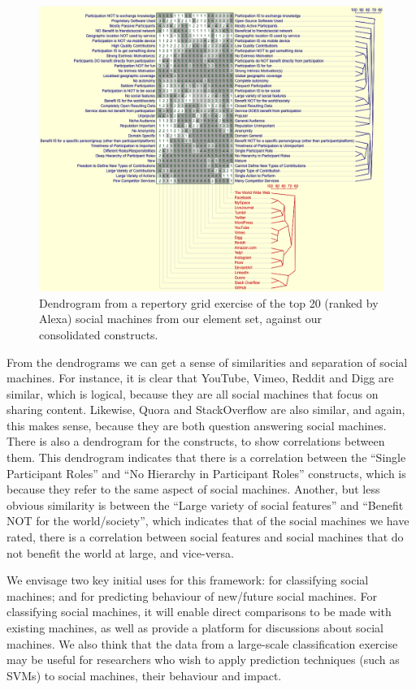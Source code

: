 \documentclass{sig-alternate}
\begin{document}
\begin{figure}
\begin{center}
\includegraphics[width=18cm]{img/dendrogram.png}
\caption{Dendrogram from a repertory grid exercise of the top 20 (ranked by Alexa) social machines from our element set, against our consolidated constructs.} \label{dendrogram}
\end{center}
\end{figure}

From the dendrograms we can get a sense of similarities and separation of social machines. For
instance, it is clear that YouTube, Vimeo, Reddit and Digg are similar, which is logical, because
they are all social machines that focus on sharing content. Likewise, Quora and StackOverflow
are also similar, and again, this makes sense, because they are both question answering social
machines. There is also a dendrogram for the constructs, to show correlations between them. This
dendrogram indicates that there is a correlation between the ``Single Participant Roles'' and
``No Hierarchy in Participant Roles'' constructs, which is because they refer to the same
aspect of social machines. Another, but less obvious similarity is between the ``Large variety of
social features'' and ``Benefit NOT for the world/society'', which indicates that of the social
machines we have rated, there is a correlation between social features and social machines that
do not benefit the world at large, and vice-versa.

We envisage two key initial uses for this framework: for classifying social machines; and for
predicting behaviour of new/future social machines. For classifying social machines, it will
enable direct comparisons to be made with existing machines, as well as provide a platform
for discussions about social machines. We also think that the data from a large-scale classification
exercise may be useful for researchers who wish to apply prediction techniques (such as SVMs)
to social machines, their behaviour and impact.
\end{document}
